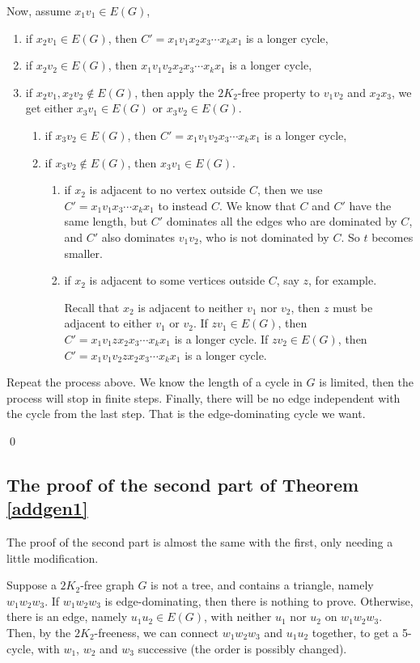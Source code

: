 \documentclass{amsart}
\theoremstyle{definition}
\begin{document}
Now, assume $x_1v_1\in E(G)$, 
\begin{enumerate}
\item if $x_2v_1\in E(G)$, then $C'=x_1v_1x_2x_3\cdots x_kx_1$ is a longer cycle,
\item if $x_2v_2\in E(G)$, then $x_1v_1v_2x_2x_3\cdots x_kx_1$ is a longer cycle, 
\item if $x_2v_1,x_2v_2\not\in E(G)$, then apply the $2K_2$-free property to $v_1v_2$ and $x_2x_3$, we get either $x_3v_1\in E(G)$ or $x_3v_2\in E(G)$.
\begin{enumerate}
\item if $x_3v_2\in E(G)$, then $C'=x_1v_1v_2x_3\cdots x_kx_1$ is a longer cycle,
\item if $x_3v_2\not\in E(G)$, then $x_3v_1\in E(G)$.
\begin{enumerate}
\item if $x_2$ is adjacent to no vertex outside $C$, then we use $C'=x_1v_1x_3\cdots x_kx_1$ to instead $C$. We know that $C$ and $C'$ have the same length, but $C'$ dominates all the edges who are dominated by $C$, and $C'$ also dominates $v_1v_2$, who is not dominated by $C$. So $t$ becomes smaller.
\item if $x_2$ is adjacent to some vertices outside $C$, say $z$, for example.

Recall that $x_2$ is adjacent to neither $v_1$ nor $v_2$, then $z$ must be adjacent to either $v_1$ or $v_2$. If $zv_1\in E(G)$, then $C'=x_1v_1zx_2x_3\cdots x_kx_1$ is a longer cycle.
If $zv_2\in E(G)$, then $C'=x_1v_1v_2zx_2x_3\cdots x_kx_1$ is a longer cycle.
\end{enumerate}

\end{enumerate}
\end{enumerate}

Repeat the process above. We know the length of a cycle in $G$ is limited, then the process will stop in finite steps. Finally, there will be no edge independent with the cycle from the last step. That is the edge-dominating cycle we want.

\qed

\subsection{The proof of the second part of Theorem  \ref{addgen1}}
The proof of the second part is almost the same with the first, only needing a little modification.

Suppose a $2K_2$-free graph $G$ is not a tree, and contains a triangle, namely $w_1w_2w_3$.
If $w_1w_2w_3$ is edge-dominating, then there is nothing to prove. Otherwise, there is an edge, namely $u_1u_2\in E(G)$, with neither $u_1$ nor $u_2$  on $w_1w_2w_3$. Then, by the $2K_2$-freeness, we can connect $w_1w_2w_3$ and $u_1u_2$ together, to get a 5-cycle, with $w_1$, $w_2$ and $w_3$ successive (the order is possibly changed). 
\end{document}
